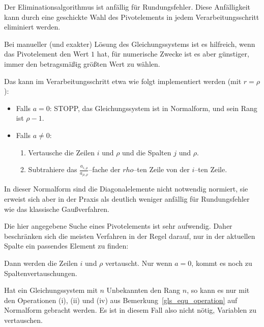 \begin{notiz}
Der Eliminationsalgorithmus ist anfällig für Rundungsfehler. Diese Anfälligkeit kann durch eine geschickte 
Wahl des Pivotelements in jedem Verarbeitungsschritt eliminiert werden. 

Bei manueller (und exakter) Lösung des Gleichungssystems ist es hilfreich, wenn das Pivotelement den 
Wert $1$ hat, für numerische Zwecke ist es aber günstiger, immer den betragsmäßig größten Wert zu wählen.  

Das kann im Verarbeitungsschritt etwa wie folgt implementiert werden (mit $r = \rho$): 

\makebox[\textwidth]{\hrulefill}  

\makebox[\textwidth]{\hrulefill} 

\begin{itemize}
\item Falls $a = 0$: STOPP, das Gleichungssystem ist in Normalform, und sein Rang ist $\rho-1$.
\item Falls $a \neq 0$: 
\begin{enumerate}
\item Vertausche die Zeilen $i$ und $\rho$ und die Spalten $j$ und $\rho$. 
\item Subtrahiere das $\frac {a_{i,\rho}}{a_{\rho, \rho}}$--fache der $rho$--ten Zeile von der $i$--ten Zeile. 
\end{enumerate}
\end{itemize}
In dieser Normalform sind die Diagonalelemente nicht notwendig normiert, sie erweist sich aber in der Praxis als 
deutlich weniger anfällig für Rundungsfehler wie das klassische Gaußverfahren. 

Die hier angegebene Suche eines Pivotelements ist sehr aufwendig. Daher beschränken sich die meisten Verfahren 
in der Regel darauf, nur in der aktuellen Spalte ein passendes Element zu finden: 

\makebox[\textwidth]{\hrulefill}  

\makebox[\textwidth]{\hrulefill} 

Dann werden die Zeilen $i$ und $\rho$ vertauscht. Nur wenn $a = 0$, kommt es noch zu Spaltenvertauschungen. 
\end{notiz}

\medbreak

\begin{satz}\label{gls_voller_rang_n} Hat ein Gleichungssystem mit $n$ Unbekannten den Rang $n$, so kann es 
nur mit den Operationen (i), (ii) und (iv) aus Bemerkung~\ref{gls_equ_operation} auf Normalform gebracht werden. 
Es ist in diesem Fall also nicht nötig, Variablen zu vertauschen. 
\end{satz}

